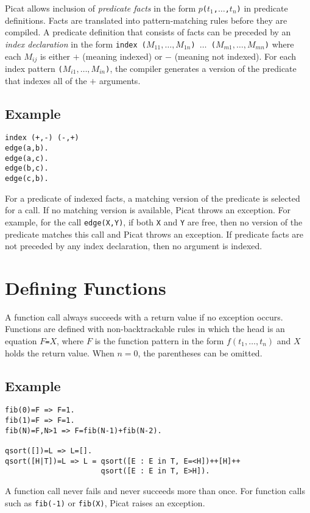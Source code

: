 Picat allows inclusion of \emph{predicate facts} in the form \texttt{$p$($t_1$,$\ldots$,$t_n$)} in predicate definitions. Facts are translated into pattern-matching rules before they are compiled. A predicate definition that consists of facts can be preceded by an \emph{index declaration} in the form \texttt{index ($M_{11},\ldots,M_{1n}$) $\ldots$ ($M_{m1},\ldots,M_{mn}$)} where each $M_{ij}$ is either $+$ (meaning indexed) or $-$ (meaning not indexed). For each index pattern \texttt{($M_{i1},\ldots,M_{in}$)}, the compiler generates a version of the predicate that indexes all of the $+$ arguments. 

\subsection*{Example}
\begin{verbatim}
index (+,-) (-,+)
edge(a,b).
edge(a,c).
edge(b,c).
edge(c,b).
\end{verbatim}
For a predicate of indexed facts, a matching version of the predicate is selected for a call. If no matching version is available, Picat throws an exception. For example, for the call \texttt{edge(X,Y)}, if both \texttt{X} and \texttt{Y} are free, then no version of the predicate matches this call and Picat throws an exception. If predicate facts are not preceded by any index declaration, then no argument is indexed.

\section{Defining Functions}
A function call always succeeds with a return value if no exception occurs. Functions are defined with non-backtrackable rules in which the head is an equation $F$\verb+=+$X$, where $F$ is the function pattern in the form $f(t_1,\ldots, t_n)$ and $X$ holds the return value. When $n=0$, the parentheses can be omitted.

\subsection*{Example}
\begin{verbatim}
fib(0)=F => F=1.
fib(1)=F => F=1.
fib(N)=F,N>1 => F=fib(N-1)+fib(N-2).

qsort([])=L => L=[].
qsort([H|T])=L => L = qsort([E : E in T, E=<H])++[H]++
                      qsort([E : E in T, E>H]).
\end{verbatim}
A function call never fails and never succeeds more than once. For function calls such as \texttt{fib(-1)} or \texttt{fib(X)}, Picat raises an exception. 

